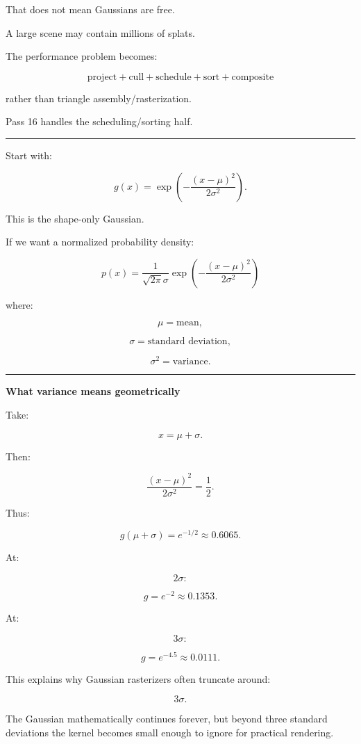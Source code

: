 That does not mean Gaussians are free.

A large scene may contain millions of splats.

The performance problem becomes:

\[
\boxed{
\text{project}
+
\text{cull}
+
\text{schedule}
+
\text{sort}
+
\text{composite}
}
\]

rather than triangle assembly/rasterization.

Pass 16 handles the scheduling/sorting half.

\begin{center}\rule{0.5\linewidth}{0.5pt}\end{center}

Start with:

\[
g(x)
=
\exp
\left(
-\frac{(x-\mu)^2}
{2\sigma^2}
\right).
\]

This is the shape-only Gaussian.

If we want a normalized probability density:

\[
\boxed{
p(x)
=
\frac{1}
{\sqrt{2\pi}\sigma}
\exp
\left(
-\frac{(x-\mu)^2}
{2\sigma^2}
\right)
}
\]

where:

\[
\mu=\text{mean},
\]

\[
\sigma=\text{standard deviation},
\]

\[
\sigma^2=\text{variance}.
\]

\begin{center}\rule{0.5\linewidth}{0.5pt}\end{center}

\textbf{What variance means geometrically}

Take:

\[
x=\mu+\sigma.
\]

Then:

\[
\frac{(x-\mu)^2}{2\sigma^2}
=
\frac12.
\]

Thus:

\[
g(\mu+\sigma)
=
e^{-1/2}
\approx0.6065.
\]

At:

\[
2\sigma:
\]

\[
g=e^{-2}
\approx0.1353.
\]

At:

\[
3\sigma:
\]

\[
g=e^{-4.5}
\approx0.0111.
\]

This explains why Gaussian rasterizers often truncate around:

\[
3\sigma.
\]

The Gaussian mathematically continues forever, but beyond three standard deviations the kernel becomes small enough to ignore for practical rendering.


